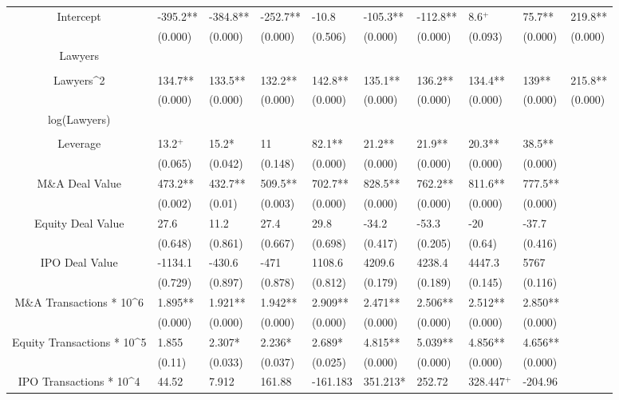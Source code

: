 \documentclass{article}
\begin{document}
\begin{table}[H]
\begin{tabular}{|clllllllll|}
Intercept & -395.2** & -384.8** & -252.7** & -10.8 & -105.3** & -112.8** & 8.6$^{+}$ & 75.7** & 219.8** \\ 
   & (0.000) & (0.000) & (0.000) & (0.506) & (0.000) & (0.000) & (0.093) & (0.000) & (0.000) \\ 
  Lawyers &  &  &  &  &  &  &  &  &  \\ 
   &  &  &  &  &  &  &  &  &  \\ 
  Lawyers^2 & 134.7** & 133.5** & 132.2** & 142.8** & 135.1** & 136.2** & 134.4** & 139** & 215.8** \\ 
   & (0.000) & (0.000) & (0.000) & (0.000) & (0.000) & (0.000) & (0.000) & (0.000) & (0.000) \\ 
  log(Lawyers) &  &  &  &  &  &  &  &  &  \\ 
   &  &  &  &  &  &  &  &  &  \\ 
  Leverage & 13.2$^{+}$ & 15.2* & 11 & 82.1** & 21.2** & 21.9** & 20.3** & 38.5** &  \\ 
   & (0.065) & (0.042) & (0.148) & (0.000) & (0.000) & (0.000) & (0.000) & (0.000) &  \\ 
  M\&A Deal Value & 473.2** & 432.7** & 509.5** & 702.7** & 828.5** & 762.2** & 811.6** & 777.5** &  \\ 
   & (0.002) & (0.01) & (0.003) & (0.000) & (0.000) & (0.000) & (0.000) & (0.000) &  \\ 
  Equity Deal Value & 27.6 & 11.2 & 27.4 & 29.8 & -34.2 & -53.3 & -20 & -37.7 &  \\ 
   & (0.648) & (0.861) & (0.667) & (0.698) & (0.417) & (0.205) & (0.64) & (0.416) &  \\ 
  IPO Deal Value & -1134.1 & -430.6 & -471 & 1108.6 & 4209.6 & 4238.4 & 4447.3 & 5767 &  \\ 
   & (0.729) & (0.897) & (0.878) & (0.812) & (0.179) & (0.189) & (0.145) & (0.116) &  \\ 
  M\&A Transactions * 10^6 & 1.895** & 1.921** & 1.942** & 2.909** & 2.471** & 2.506** & 2.512** & 2.850** &  \\ 
   & (0.000) & (0.000) & (0.000) & (0.000) & (0.000) & (0.000) & (0.000) & (0.000) &  \\ 
  Equity Transactions * 10^5 & 1.855 & 2.307* & 2.236* & 2.689* & 4.815** & 5.039** & 4.856** & 4.656** &  \\ 
   & (0.11) & (0.033) & (0.037) & (0.025) & (0.000) & (0.000) & (0.000) & (0.000) &  \\ 
  IPO Transactions * 10^4 & 44.52 & 7.912 & 161.88 & -161.183 & 351.213* & 252.72 & 328.447$^{+}$ & -204.96 &  \\ 

\end{tabular}
\end{table}
\end{document}
